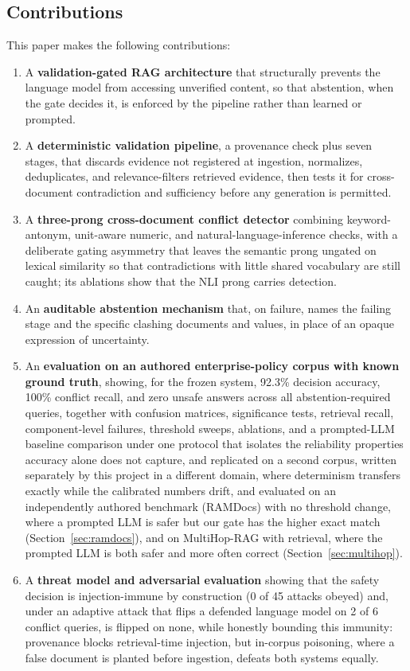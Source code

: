 \documentclass[conference]{IEEEtran}
\begin{document}
\subsection*{Contributions}
This paper makes the following contributions:
\begin{enumerate}
    \item A \textbf{validation-gated RAG architecture} that structurally
    prevents the language model from accessing unverified content, so that
    abstention, when the gate decides it, is enforced by the pipeline rather
    than learned or prompted.
    \item A \textbf{deterministic validation pipeline}, a provenance check
    plus seven stages, that discards evidence not registered at ingestion,
    normalizes, deduplicates, and relevance-filters retrieved evidence, then
    tests it for cross-document contradiction and sufficiency before any
    generation is permitted.
    \item A \textbf{three-prong cross-document conflict detector} combining
    keyword-antonym, unit-aware numeric, and natural-language-inference
    checks, with a deliberate gating asymmetry that leaves the semantic
    prong ungated on lexical similarity so that contradictions with little
    shared vocabulary are still caught; its ablations show that the NLI prong
    carries detection.
    \item An \textbf{auditable abstention mechanism} that, on failure, names
    the failing stage and the specific clashing documents and values, in
    place of an opaque expression of uncertainty.
    \item An \textbf{evaluation on an authored enterprise-policy corpus with
    known ground truth}, showing, for the frozen system, 92.3\% decision accuracy, 100\% conflict
    recall, and zero unsafe answers across all abstention-required queries,
    together with confusion matrices, significance tests, retrieval recall,
    component-level failures, threshold sweeps, ablations, and a prompted-LLM
    baseline comparison under one protocol that isolates the reliability
    properties accuracy alone does not capture, and
    replicated on a second corpus, written separately by this project in a
    different domain, where determinism transfers exactly while the calibrated numbers
    drift, and evaluated on an independently authored benchmark (RAMDocs) with no threshold change, where a prompted LLM is safer but our gate has the higher exact match (Section~\ref{sec:ramdocs}), and on MultiHop-RAG with retrieval, where the prompted LLM is both safer and more often correct (Section~\ref{sec:multihop}).
    \item A \textbf{threat model and adversarial evaluation} showing that the
    safety decision is injection-immune by construction (0 of 45 attacks
    obeyed) and, under an adaptive attack that flips a defended language model
    on 2 of 6 conflict queries, is flipped on none, while honestly bounding
    this immunity: provenance blocks retrieval-time injection, but in-corpus
    poisoning, where a false document is planted before ingestion, defeats
    both systems equally.
\end{enumerate}
\end{document}
